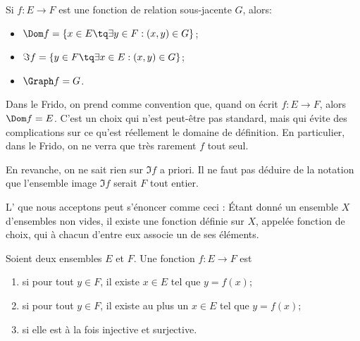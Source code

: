 \begin{remark}\label{RemLienFctRelation}
	Si \( f: E \to F \) est une fonction de relation sous-jacente \( G \), alors:
	\begin{itemize}
		\item \( \Dom f = \{ x \in E \tq \exists y \in F: (x, y) \in G\} \);
		\item \( \Im f = \{ y \in F \tq \exists x \in E: (x, y) \in G\} \);
		\item \( \Graph f = G \).
	\end{itemize}
\end{remark}

\begin{remark}	\label{REMooFonctionDomaineEntier}
	Dans le Frido, on prend comme convention que, quand on écrit \( f: E \to F \), alors \( \Dom f = E \). C'est un choix qui n'est peut-être pas standard, mais qui évite des complications sur ce qu'est réellement le domaine de définition. En particulier, dans le Frido, on ne verra que très rarement \( f \) \og tout seul\fg.

 	En revanche, on ne sait rien sur \( \Im f \) a priori. Il ne faut pas déduire de la notation que l'ensemble image \( \Im f \) serait \( F \) tout entier.
\end{remark}

\begin{normaltext}\label{NORooLMBYooYjUoju}
	L' que nous acceptons peut s'énoncer comme ceci\cite{ooKLIXooHbpufL} : Étant donné un ensemble \( X\) d'ensembles non vides, il existe une fonction définie sur \( X\), appelée fonction de choix, qui à chacun d'entre eux associe un de ses éléments.
\end{normaltext}

\begin{definition}\label{DefooInjSurjBij}
	Soient deux ensembles \( E\) et \( F\). Une fonction \( f\colon E\to F\) est
	\begin{enumerate}
		\item
		       si pour tout \( y\in F\), il existe \( x\in E\) tel que \( y=f(x)\);
		\item
		       si pour tout \( y\in F\), il existe au plus un \(x\in E \) tel que \( y=f(x)\);
		\item
		       si elle est à la fois injective et surjective.
	\end{enumerate}
\end{definition}


